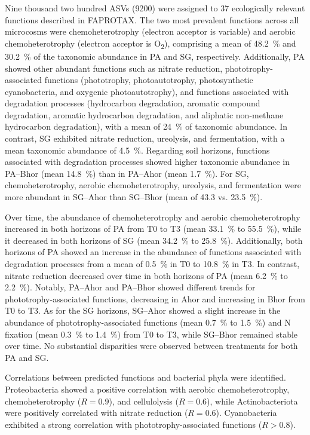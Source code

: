 Nine thousand two hundred ASVs (\num{9200}) were assigned to 37 ecologically relevant functions described in FAPROTAX. The two most prevalent functions across all microcosms were chemoheterotrophy (electron acceptor is variable) and aerobic chemoheterotrophy (electron acceptor is O\textsubscript{2}), comprising a mean of \SI{48.2}{\percent} and \SI{30.2}{\percent} of the taxonomic abundance in PA and SG, respectively. Additionally, PA showed other abundant functions such as nitrate reduction, phototrophy-associated functions (phototrophy, photoautotrophy, photosynthetic cyanobacteria, and oxygenic photoautotrophy), and functions associated with degradation processes (hydrocarbon degradation, aromatic compound degradation, aromatic hydrocarbon degradation, and aliphatic non-methane hydrocarbon degradation), with a mean of \SI{24}{\percent} of taxonomic abundance. In contrast, SG exhibited nitrate reduction, ureolysis, and fermentation, with a mean taxonomic abundance of \SI{4.5}{\percent}. Regarding soil horizons, functions associated with degradation processes showed higher taxonomic abundance in PA--Bhor (mean \SI{14.8}{\percent}) than in PA--Ahor (mean \SI{1.7}{\percent}). For SG, chemoheterotrophy, aerobic chemoheterotrophy, ureolysis, and fermentation were more abundant in SG--Ahor than SG--Bhor (mean of 43.3 vs. \SI{23.5}{\percent}).

Over time, the abundance of chemoheterotrophy and aerobic chemoheterotrophy increased in both horizons of PA from T0 to T3 (mean \SI{33.1}{\percent} to \SI{55.5}{\percent}), while it decreased in both horizons of SG (mean \SI{34.2}{\percent} to \SI{25.8}{\percent}). Additionally, both horizons of PA showed an increase in the abundance of functions associated with degradation processes from a mean of \SI{0.5}{\percent} in T0 to \SI{10.8}{\percent} in T3. In contrast, nitrate reduction decreased over time in both horizons of PA (mean \SI{6.2}{\percent} to \SI{2.2}{\percent}). Notably, PA--Ahor and PA--Bhor showed different trends for phototrophy-associated functions, decreasing in Ahor and increasing in Bhor from T0 to T3. As for the SG horizons, SG--Ahor showed a slight increase in the abundance of phototrophy-associated functions (mean \SI{0.7}{\percent} to \SI{1.5}{\percent}) and N fixation (mean \SI{0.3}{\percent} to \SI{1.4}{\percent}) from T0 to T3, while SG--Bhor remained stable over time. No substantial disparities were observed between treatments for both PA and SG.

Correlations between predicted functions and bacterial phyla were identified. Proteobacteria showed a positive correlation with aerobic chemoheterotrophy, chemoheterotrophy (\(R=0.9\)), and cellulolysis (\(R=0.6\)), while Actinobacteriota were positively correlated with nitrate reduction (\(R=0.6\)). Cyanobacteria exhibited a strong correlation with phototrophy-associated functions (\(R > 0.8\)).

